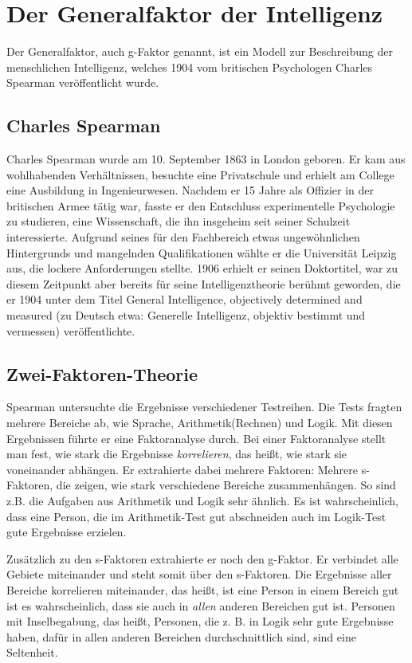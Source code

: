 \chapter{Der Generalfaktor der Intelligenz}

Der Generalfaktor, auch g-Faktor genannt, ist ein Modell zur Beschreibung der
menschlichen Intelligenz, welches 1904 vom britischen Psychologen
Charles Spearman veröffentlicht wurde. \cite{wiki_spearman}

\section{Charles Spearman}
Charles Spearman wurde am 10. September 1863 in London geboren. \cite{wiki_spearman} Er kam aus wohlhabenden Verhältnissen, besuchte eine Privatschule und erhielt am College eine Ausbildung in Ingenieurwesen. Nachdem er 15 Jahre als Offizier in der britischen Armee tätig war, fasste er den Entschluss experimentelle Psychologie zu studieren, eine Wissenschaft, die ihn insgeheim seit seiner Schulzeit interessierte. \cite{galton_spearman} Aufgrund seines für den Fachbereich etwas ungewöhnlichen Hintergrunds und mangelnden Qualifikationen wählte er die Universität Leipzig aus, die lockere Anforderungen stellte. 1906 erhielt er seinen Doktortitel, war zu diesem Zeitpunkt aber bereits für seine Intelligenztheorie berühmt geworden, die er 1904 unter dem Titel \glqq General Intelligence, objectively determined and measured\grqq{} (zu Deutsch etwa: Generelle Intelligenz, objektiv bestimmt und vermessen) veröffentlichte.
\cite{wiki_en_spearman} \cite{york_spearman}

\section{Zwei-Faktoren-Theorie}
Spearman untersuchte die Ergebnisse verschiedener Testreihen. Die Tests fragten mehrere Bereiche ab, wie Sprache, Arithmetik(Rechnen) und Logik. Mit diesen Ergebnissen führte er eine Faktoranalyse durch. Bei einer Faktoranalyse stellt man fest, wie stark die Ergebnisse \emph{korrelieren}, das heißt, wie stark sie voneinander abhängen. Er extrahierte dabei mehrere Faktoren: Mehrere s-Faktoren, die zeigen, wie stark verschiedene Bereiche zusammenhängen. So sind z.B. die Aufgaben aus Arithmetik und Logik sehr ähnlich. Es ist wahrscheinlich, dass eine Person, die im Arithmetik-Test gut abschneiden auch im Logik-Test gute Ergebnisse erzielen.

Zusätzlich zu den s-Faktoren extrahierte er noch den g-Faktor. Er verbindet alle Gebiete miteinander und steht somit über den s-Faktoren. Die Ergebnisse aller Bereiche korrelieren miteinander, das heißt, ist eine Person in einem Bereich gut ist es wahrscheinlich, dass sie auch in \emph{allen} anderen Bereichen gut ist. Personen mit Inselbegabung, das heißt, Personen, die z. B. in Logik sehr gute Ergebnisse haben, dafür in allen anderen Bereichen durchschnittlich sind, sind eine Seltenheit.

